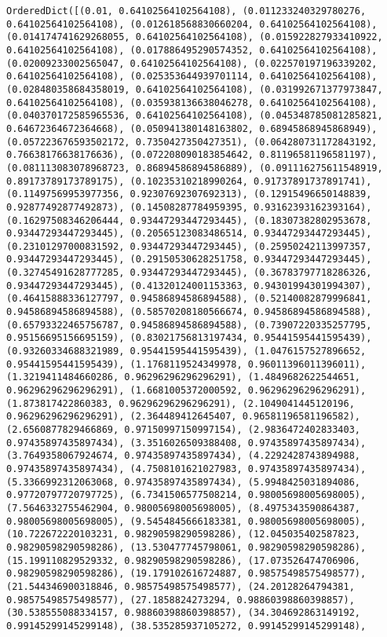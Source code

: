 \documentclass[11pt]{article}
\begin{document}
    \begin{Verbatim}[commandchars=\\\{\}]
OrderedDict([(0.01, 0.64102564102564108), (0.011233240329780276, 0.64102564102564108), (0.012618568830660204, 0.64102564102564108), (0.014174741629268055, 0.64102564102564108), (0.015922827933410922, 0.64102564102564108), (0.017886495290574352, 0.64102564102564108), (0.02009233002565047, 0.64102564102564108), (0.022570197196339202, 0.64102564102564108), (0.025353644939701114, 0.64102564102564108), (0.028480358684358019, 0.64102564102564108), (0.031992671377973847, 0.64102564102564108), (0.035938136638046278, 0.64102564102564108), (0.040370172585965536, 0.64102564102564108), (0.045348785081285821, 0.64672364672364668), (0.050941380148163802, 0.68945868945868949), (0.057223676593502172, 0.7350427350427351), (0.064280731172843192, 0.76638176638176636), (0.072208090183854642, 0.81196581196581197), (0.081113083078968723, 0.86894586894586889), (0.091116275611548919, 0.89173789173789175), (0.10235310218990264, 0.91737891737891741), (0.11497569953977356, 0.92307692307692313), (0.12915496650148839, 0.92877492877492873), (0.14508287784959395, 0.93162393162393164), (0.16297508346206444, 0.93447293447293445), (0.18307382802953678, 0.93447293447293445), (0.20565123083486514, 0.93447293447293445), (0.23101297000831592, 0.93447293447293445), (0.25950242113997357, 0.93447293447293445), (0.29150530628251758, 0.93447293447293445), (0.32745491628777285, 0.93447293447293445), (0.36783797718286326, 0.93447293447293445), (0.41320124001153363, 0.94301994301994307), (0.46415888336127797, 0.94586894586894588), (0.52140082879996841, 0.94586894586894588), (0.58570208180566674, 0.94586894586894588), (0.65793322465756787, 0.94586894586894588), (0.73907220335257795, 0.95156695156695159), (0.83021756813197434, 0.95441595441595439), (0.93260334688321989, 0.95441595441595439), (1.0476157527896652, 0.95441595441595439), (1.1768119524349978, 0.96011396011396011), (1.3219411484660286, 0.96296296296296291), (1.4849682622544651, 0.96296296296296291), (1.6681005372000592, 0.96296296296296291), (1.873817422860383, 0.96296296296296291), (2.1049041445120196, 0.96296296296296291), (2.364489412645407, 0.96581196581196582), (2.6560877829466869, 0.97150997150997154), (2.9836472402833403, 0.97435897435897434), (3.3516026509388408, 0.97435897435897434), (3.7649358067924674, 0.97435897435897434), (4.2292428743894988, 0.97435897435897434), (4.7508101621027983, 0.97435897435897434), (5.3366992312063068, 0.97435897435897434), (5.9948425031894086, 0.97720797720797725), (6.7341506577508214, 0.98005698005698005), (7.5646332755462904, 0.98005698005698005), (8.4975343590864387, 0.98005698005698005), (9.5454845666183381, 0.98005698005698005), (10.722672220103231, 0.98290598290598286), (12.045035402587823, 0.98290598290598286), (13.530477745798061, 0.98290598290598286), (15.199110829529332, 0.98290598290598286), (17.073526474706906, 0.98290598290598286), (19.179102616724887, 0.98575498575498577), (21.544346900318846, 0.98575498575498577), (24.20128264794381, 0.98575498575498577), (27.1858824273294, 0.98860398860398857), (30.538555088334157, 0.98860398860398857), (34.304692863149192, 0.99145299145299148), (38.535285937105272, 0.99145299145299148), 
\end{Verbatim}
\end{document}
